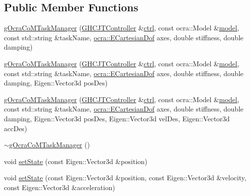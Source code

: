 \subsection*{Public Member Functions}
\begin{DoxyCompactItemize}
\item 
\hyperlink{classgocra_1_1gOcraCoMTaskManager_a7e9edb0004e6c63e689fcc3f260bdf96}{g\+Ocra\+Co\+M\+Task\+Manager} (\hyperlink{classgocra_1_1GHCJTController}{G\+H\+C\+J\+T\+Controller} \&\hyperlink{classgocra_1_1gOcraTaskManagerBase_a52d76d9b54d92f3d31faeaafda99e4c7}{ctrl}, const ocra\+::\+Model \&\hyperlink{classgocra_1_1gOcraTaskManagerBase_adc439e7170f7120611fc6d009d06404e}{model}, const std\+::string \&task\+Name, \hyperlink{namespaceocra_a436781c7059a0f76027df1c652126260}{ocra\+::\+E\+Cartesian\+Dof} axes, double stiffness, double damping)
\item 
\hyperlink{classgocra_1_1gOcraCoMTaskManager_a13a282eaeb3edb57adee2b5973f9ad71}{g\+Ocra\+Co\+M\+Task\+Manager} (\hyperlink{classgocra_1_1GHCJTController}{G\+H\+C\+J\+T\+Controller} \&\hyperlink{classgocra_1_1gOcraTaskManagerBase_a52d76d9b54d92f3d31faeaafda99e4c7}{ctrl}, const ocra\+::\+Model \&\hyperlink{classgocra_1_1gOcraTaskManagerBase_adc439e7170f7120611fc6d009d06404e}{model}, const std\+::string \&task\+Name, \hyperlink{namespaceocra_a436781c7059a0f76027df1c652126260}{ocra\+::\+E\+Cartesian\+Dof} axes, double stiffness, double damping, Eigen\+::\+Vector3d pos\+Des)
\item 
\hyperlink{classgocra_1_1gOcraCoMTaskManager_a4088d516f4de3db74ccef3bb4560f3fa}{g\+Ocra\+Co\+M\+Task\+Manager} (\hyperlink{classgocra_1_1GHCJTController}{G\+H\+C\+J\+T\+Controller} \&\hyperlink{classgocra_1_1gOcraTaskManagerBase_a52d76d9b54d92f3d31faeaafda99e4c7}{ctrl}, const ocra\+::\+Model \&\hyperlink{classgocra_1_1gOcraTaskManagerBase_adc439e7170f7120611fc6d009d06404e}{model}, const std\+::string \&task\+Name, \hyperlink{namespaceocra_a436781c7059a0f76027df1c652126260}{ocra\+::\+E\+Cartesian\+Dof} axes, double stiffness, double damping, Eigen\+::\+Vector3d pos\+Des, Eigen\+::\+Vector3d vel\+Des, Eigen\+::\+Vector3d acc\+Des)
\item 
\hyperlink{classgocra_1_1gOcraCoMTaskManager_ae1de7bee1de0ccd0b904baccdd4ca9c0}{$\sim$g\+Ocra\+Co\+M\+Task\+Manager} ()
\item 
void \hyperlink{classgocra_1_1gOcraCoMTaskManager_a413a7722455a89c99c4efd11e8226104}{set\+State} (const Eigen\+::\+Vector3d \&position)
\item 
void \hyperlink{classgocra_1_1gOcraCoMTaskManager_a652fe54cce0b1e88aba3ed0b07da1bc4}{set\+State} (const Eigen\+::\+Vector3d \&position, const Eigen\+::\+Vector3d \&velocity, const Eigen\+::\+Vector3d \&acceleration)

\end{DoxyCompactItemize}
